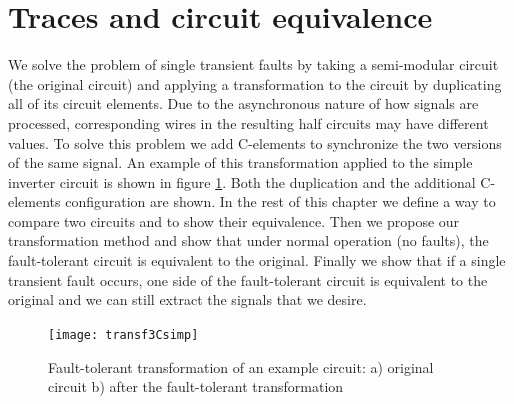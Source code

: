 \documentclass[12pt]{report}
\begin{document}
\section{Traces and circuit equivalence}
We solve the problem of single transient faults by taking a semi-modular circuit (the original circuit) and applying a transformation to the circuit by duplicating all of its circuit elements.  Due to the asynchronous nature of how signals are processed, corresponding wires in the resulting half circuits may have different values.  To solve this problem we add C-elements to synchronize the two versions of the same signal.   An example of this transformation applied to the simple inverter circuit is shown in figure \ref{fig:dupschemeex}.  Both the duplication and the additional C-elements configuration are shown.  In the rest of this chapter we define a way to compare two circuits and to show their equivalence.  Then we propose our transformation method and show that under normal operation (no faults), the fault-tolerant circuit is equivalent to the original.  Finally we show that if a single transient fault occurs, one side of the fault-tolerant circuit is equivalent to the original and we can still extract the signals that we desire.\\
\begin{figure}
  \centering
    \texttt{[image: transf3Csimp]}
  \caption[Fault-tolerant transformation of an example circuit]{Fault-tolerant transformation of an example circuit: a) original circuit b) after the fault-tolerant transformation}
  \label{fig:dupschemeex}
\end{figure}
\end{document}
